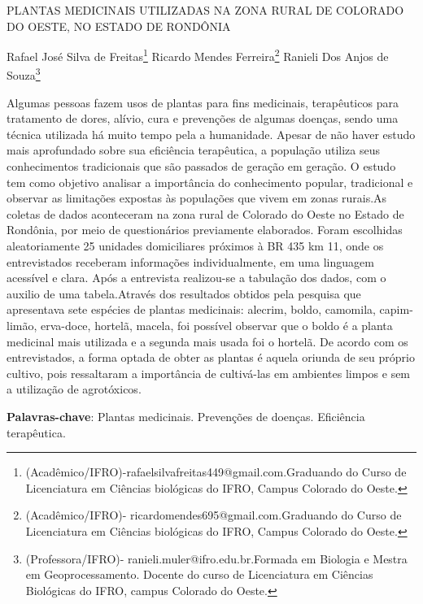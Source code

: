 \documentclass[article,12pt,onesidea,4paper,english,brazil]{abntex2}
\begin{document}
	
	
	\frenchspacing 
	
	\begin{center}
		\LARGE PLANTAS MEDICINAIS UTILIZADAS NA ZONA RURAL DE COLORADO DO
		OESTE, NO ESTADO DE RONDÔNIA
		
		\normalsize
	Rafael José Silva de Freitas\footnote{(Acadêmico/IFRO)-rafaelsilvafreitas449@gmail.com.Graduando do Curso de Licenciatura em Ciências biológicas do IFRO, Campus Colorado do Oeste.} 
	Ricardo Mendes Ferreira\footnote{(Acadêmico/IFRO)- ricardomendes695@gmail.com.Graduando do Curso de Licenciatura em Ciências biológicas do IFRO, Campus Colorado do Oeste.} 
	Ranieli Dos Anjos de Souza\footnote{(Professora/IFRO)- ranieli.muler@ifro.edu.br.Formada em Biologia e Mestra em Geoprocessamento. Docente do curso de Licenciatura em Ciências Biológicas do IFRO, campus Colorado do Oeste.} 
	\end{center}
	
	\noindent Algumas pessoas fazem usos de plantas para fins medicinais,
	terapêuticos para tratamento de dores, alívio, cura e prevenções de algumas
	doenças, sendo uma técnica utilizada há muito tempo pela a humanidade. Apesar de
	não haver estudo mais aprofundado sobre sua eficiência terapêutica, a população
	utiliza seus conhecimentos tradicionais que são passados de geração em geração.
	O estudo tem como objetivo analisar a importância do conhecimento popular,
	tradicional e observar as limitações expostas às populações que vivem em zonas
	rurais.As coletas de dados aconteceram na zona rural de Colorado do
	Oeste no Estado de Rondônia, por meio de questionários previamente elaborados.
	Foram escolhidas aleatoriamente 25 unidades domiciliares próximos à BR 435 km
	11, onde os entrevistados receberam informações individualmente, em uma
	linguagem acessível e clara. Após a entrevista realizou-se a tabulação dos dados,
	com o auxilio de uma tabela.Através dos resultados obtidos pela
	pesquisa que apresentava sete espécies de plantas medicinais: alecrim, boldo,
	camomila, capim-limão, erva-doce, hortelã, macela, foi possível observar que o
	boldo é a planta medicinal mais utilizada e a segunda mais usada foi o hortelã. De
	acordo com os entrevistados, a forma optada de obter as plantas é aquela oriunda
	de seu próprio cultivo, pois ressaltaram a importância de cultivá-las em ambientes
	limpos e sem a utilização de agrotóxicos.
	
	
	\vspace{\onelineskip}
	
	\noindent
	\textbf{Palavras-chave}: Plantas medicinais. Prevenções de doenças. Eficiência terapêutica.
	
\end{document}

